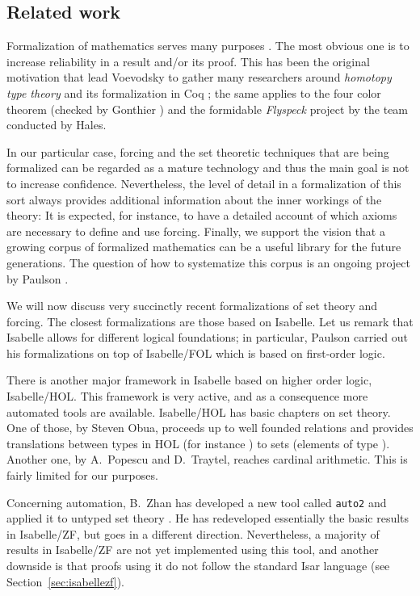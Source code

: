 \subsection{Related work}\label{sec:related-work}
Formalization of mathematics serves many purposes
\cite{simpson-theorem-proving-math}. The most obvious one is to
increase reliability in a result and/or its proof. This has been the
original motivation that lead Voevodsky to gather many researchers
around \emph{homotopy type theory} and its formalization in Coq
\cite{hottbook}; the same applies to the four color theorem (checked
by Gonthier \cite{MR2463991}) and the formidable \emph{Flyspeck}
project \cite{MR3659768} by the team conducted by Hales.

In our particular case, forcing and the set theoretic techniques that
are being formalized can be regarded as a mature technology and thus
the main goal is not to increase confidence. Nevertheless, the level
of detail in a formalization of this sort always provides additional
information about the inner workings of the theory: It is expected, for
instance, to have a detailed account of which axioms are necessary to
define and use forcing. Finally, we support the vision that a growing
corpus of formalized mathematics can be a useful library for the
future generations. The question of how to systematize this corpus is
an ongoing project by Paulson \cite{ALEXANDRIA}.

We will now discuss very succinctly recent formalizations of
set theory and forcing. The closest formalizations are those based on
Isabelle. Let us remark that Isabelle allows for different logical
foundations; in particular, Paulson carried out his formalizations
on top of Isabelle/FOL which is based on first-order logic.

There is another major framework in Isabelle based on higher order
logic, Isabelle/HOL. This framework is very active, and as a 
consequence more automated tools are available. Isabelle/HOL has 
basic chapters on set theory. One of those, by Steven Obua, proceeds up to
well founded relations and provides translations between types in HOL
(for instance ) to  sets  (elements of type
). Another one, by A.~Popescu and D.~Traytel, reaches
cardinal arithmetic. This is fairly limited for our purposes.

Concerning automation, B.~Zhan has developed a new tool called
\texttt{auto2} and applied it to untyped set theory
\cite{10.1007/978-3-319-66107-0_32}. He has redeveloped essentially
the basic results in Isabelle/ZF, but goes in a different
direction. Nevertheless, a majority of results in
Isabelle/ZF are not yet implemented using this tool, and  another
downside is that proofs using it do not follow the standard Isar
language (see Section~\ref{sec:isabellezf}).

